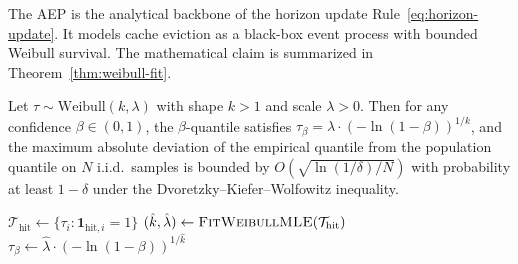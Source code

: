 The AEP is the analytical backbone of the horizon update
Rule~\eqref{eq:horizon-update}. It models cache eviction as a
black-box event process with bounded Weibull survival. The
mathematical claim is summarized in
Theorem~\ref{thm:weibull-fit}.

\begin{theorem}
\label{thm:weibull-fit}
Let $\tau \sim \mathrm{Weibull}(k, \lambda)$ with shape $k > 1$ and
scale $\lambda > 0$. Then for any confidence $\beta \in (0, 1)$, the
$\beta$-quantile satisfies
$\tau_\beta = \lambda \cdot (-\ln(1-\beta))^{1/k}$, and the maximum
absolute deviation of the empirical quantile from the population
quantile on $N$ i.i.d.\ samples is bounded by
$O(\sqrt{\ln(1/\delta)/N})$ with probability at least $1-\delta$
under the Dvoretzky--Kiefer--Wolfowitz inequality.
\end{theorem}

\begin{algorithm}[ht]
\caption{Asymmetric Eviction Prediction.}
\label{alg:aep}
\SetAlgoLined
{}

\BlankLine
$\mathcal{T}_{\text{hit}} \leftarrow \{ \tau_i : \mathbf{1}_{\text{hit},i} = 1 \}$\;
$(\hat{k}, \hat{\lambda}) \leftarrow \textsc{FitWeibullMLE}(\mathcal{T}_{\text{hit}})$\;
\BlankLine
{}
\BlankLine
$\tau_\beta \leftarrow \hat{\lambda} \cdot (-\ln(1-\beta))^{1/\hat{k}}$\;
\BlankLine
{}
\BlankLine
{}\;
\end{algorithm}

